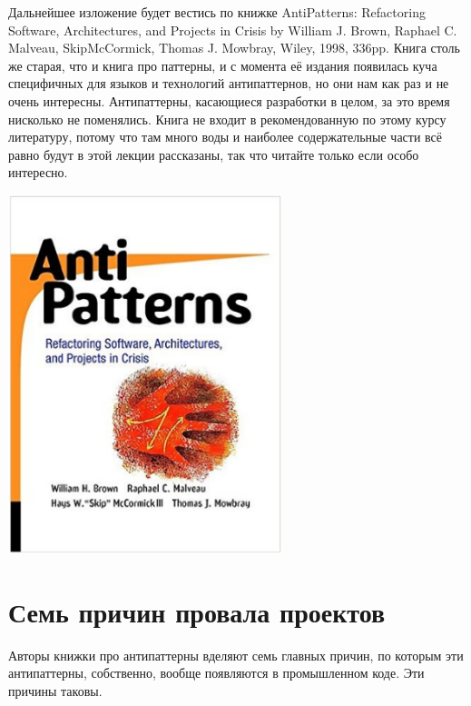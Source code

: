 \documentclass[a5paper]{article}
\newlength\Colsep
\begin{document}
\noindent\begin{minipage}{\textwidth}
	\begin{minipage}[c][6cm][c]{\dimexpr0.7\textwidth-0.5\Colsep\relax}
		Дальнейшее изложение будет вестись по книжке AntiPatterns: Refactoring Software, Architectures, and Projects in Crisis by William J. Brown, Raphael C. Malveau, SkipMcCormick, Thomas J. Mowbray, Wiley, 1998, 336pp. Книга столь же старая, что и книга про паттерны, и с момента её издания появилась куча специфичных для языков и технологий антипаттернов, но они нам как раз и не очень интересны. Антипаттерны, касающиеся разработки в целом, за это время нисколько не поменялись. Книга не входит в рекомендованную по этому курсу литературу, потому что там много воды и наиболее содержательные части всё равно будут в этой лекции рассказаны, так что читайте только если особо интересно.
	\end{minipage}\hfill
	\begin{minipage}[c][6cm][c]{\dimexpr0.3\textwidth-0.5\Colsep\relax}
		\includegraphics[width=0.6\textwidth]{bookCover.png}
	\end{minipage}%
\end{minipage}

\section{Семь причин провала проектов}

Авторы книжки про антипаттерны вделяют семь главных причин, по которым эти антипаттерны, собственно, вообще появляются в промышленном коде. Эти причины таковы.
\end{document}

